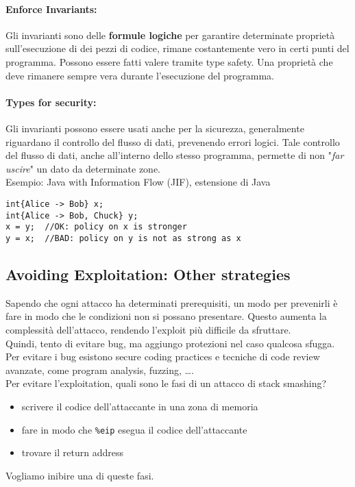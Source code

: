 \paragraph{Enforce Invariants:} Gli invarianti sono delle \textbf{formule logiche} per garantire determinate proprietà sull'esecuzione di dei pezzi di codice, rimane costantemente vero in certi punti del programma. Possono essere fatti valere tramite type safety. Una proprietà che deve rimanere sempre vera durante l'esecuzione del programma.\\

\paragraph{Types for security:} Gli invarianti possono essere usati anche per la sicurezza, generalmente riguardano il controllo del flusso di dati, prevenendo errori logici. Tale controllo del flusso di dati, anche all'interno dello stesso programma, permette di non "\textit{far uscire}" un dato da determinate zone.\\

Esempio: Java with Information Flow (JIF), estensione di Java
\begin{verbatim}
int{Alice -> Bob} x;
int{Alice -> Bob, Chuck} y;
x = y; 	//OK: policy on x is stronger
y = x; 	//BAD: policy on y is not as strong as x
\end{verbatim}

\newpage

\subsection{Avoiding Exploitation: Other strategies}
Sapendo che ogni attacco ha determinati prerequisiti, un modo per prevenirli è fare in modo che le condizioni non si possano presentare. Questo aumenta la complessità dell'attacco, rendendo l'exploit più difficile da sfruttare. \\

Quindi, tento di evitare bug, ma aggiungo protezioni nel caso qualcosa sfugga. Per evitare i bug esistono secure coding practices e tecniche di code review avanzate, come program analysis, fuzzing, \dots.\\

Per evitare l'exploitation, quali sono le fasi di un attacco di stack smashing?
\begin{itemize}
	\item scrivere il codice dell'attaccante in una zona di memoria
	\item fare in modo che \texttt{\%eip} esegua il codice dell'attaccante
	\item trovare il return address
\end{itemize}
Vogliamo inibire una di queste fasi.\\

